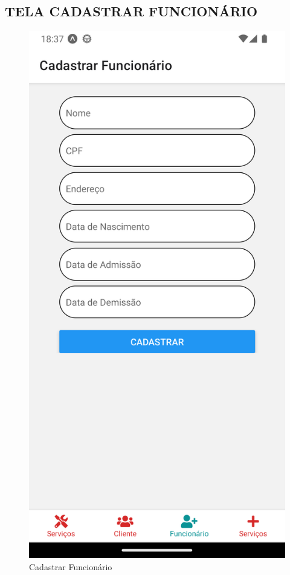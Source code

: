\subsection{TELA CADASTRAR FUNCIONÁRIO}
\begin{figure}[htb]
	\caption{\label{fig_diagrama-classes} Cadastrar Funcionário}
	\begin{center}
	    \includegraphics[width=0.5\linewidth]{imagens/tela-cadastrar-funcionario.png}
	\end{center}
\end{figure}

\newpage

